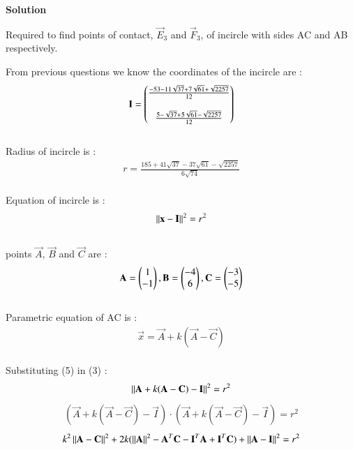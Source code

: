\documentclass[journal,12pt,twocolumn]{IEEEtran}
\theoremstyle{remark}
\begin{document}
\begin{flushleft}
	\textbf{Solution}\\
	\bigskip

	Required to find points of contact, $\vec{E}_3$ and $\vec{F}_3$, of incircle with sides AC and AB respectively.\\

	\bigskip

	From previous questions we know the coordinates of the incircle are : 
	\begin{align}
		\mathbf{I} = 
		\begin{pmatrix}
			\frac{-53-11\sqrt{37}+7\sqrt{61}+\sqrt{2257}}{12} \\ \\
			\frac{5-\sqrt{37}+5\sqrt{61}-\sqrt{2257}}{12}
		\end{pmatrix}
	\end{align}\\

	Radius of incircle is :
    \begin{align}
		r = \frac{185+41\sqrt{37}-37\sqrt{61}-\sqrt{2257}}{6\sqrt{74}}
    \end{align}\\

	Equation of incircle is : 
	\begin{align}
		{\left\lVert \mathbf{x}-\mathbf{I} \right\rVert}^2 = {r}^2 
	\end{align}\\

	points $\vec{A}$, $\vec{B}$ and $\vec{C}$ are : 
	\begin{align}
		\mathbf{A} = \begin{pmatrix}
			1\\
			-1
		\end{pmatrix}, 
		\mathbf{B} = \begin{pmatrix}
			-4\\
			6
		\end{pmatrix}, 
		\mathbf{C} = \begin{pmatrix}
			-3\\
			-5
		\end{pmatrix}
	\end{align}\\

	Parametric equation of AC is :
	\begin{align}
		\vec{x} = \vec{A} + k(\vec{A}-\vec{C})
	\end{align}\\
	
	Substituting (5) in (3) : 
	\begin{align}
		{\left\lVert \mathbf{A}+k(\mathbf{A}-\mathbf{C})-\mathbf{I} \right\rVert}^2 = {r}^2 
	\end{align}
	\begin{align}
		(\vec{A}+k(\vec{A}-\vec{C})-\vec{I})\cdot(\vec{A}+k(\vec{A}-\vec{C})-\vec{I}) = {r}^2
	\end{align}
	\begin{align}
		k^2 \left\lVert\mathbf{A}-\mathbf{C}\right\rVert^2 + 2k(\left\lVert\mathbf{A}\right\rVert^2 - {\mathbf{A}}^T \mathbf{C} - {\mathbf{I}}^T \mathbf{A} + {\mathbf{I}}^T \mathbf{C}) + \left\lVert\mathbf{A}-\mathbf{I}\right\rVert^2 = {r}^2
	\end{align}


\end{flushleft}
\end{document}
